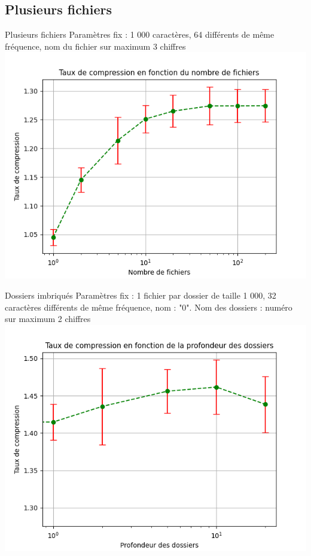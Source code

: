 \documentclass{beamer}
\begin{document}
\subsection{Plusieurs fichiers}
\begin{frame}{Plusieurs fichiers}
    Paramètres fix : 1 000 caractères, 64 différents de même fréquence, nom du fichier sur maximum 3 chiffres
    \includegraphics[scale=0.6]{nb_fich.png}
\end{frame}

\begin{frame}{Dossiers imbriqués}
    Paramètres fix : 1 fichier par dossier de taille 1 000, 32 caractères différents de même fréquence, nom : "0". Nom des dossiers : numéro sur maximum 2 chiffres 
    \includegraphics[scale=0.57]{prof_doss.png}
\end{frame}
\end{document}
